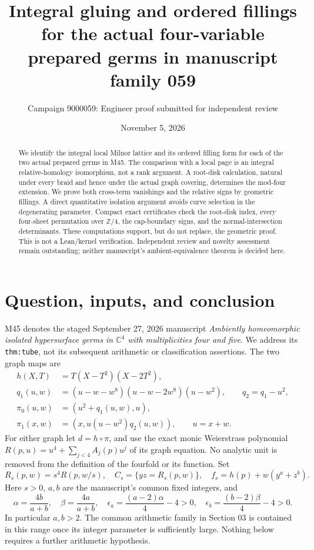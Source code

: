 \documentclass[11pt]{article}
\title{Integral gluing and ordered fillings for the actual
four-variable prepared germs in manuscript family 059}
\author{Campaign 9000059: Engineer proof submitted for independent review}
\date{November 5, 2026}
\newcommand{\Z}{\mathbb Z}
\newcommand{\C}{\mathbb C}
\begin{document}
\maketitle

\begin{abstract}
We identify the integral local Milnor lattice and its ordered filling
form for each of the two actual prepared germs in M45. The comparison
with a local page is an integral relative-homology isomorphism, not a
rank argument. A root-disk calculation, natural under every braid
and hence under the actual graph covering, determines the mod-four
extension. We prove both cross-term vanishings and the relative signs
by geometric fillings. A direct quantitative isolation argument
avoids curve selection in the degenerating parameter. Compact exact
certificates check the root-disk index, every four-sheet permutation
over \(\Z/4\), the cap-boundary signs, and the normal-intersection
determinants. These computations support, but do not replace, the
geometric proof. This is not a Lean/kernel verification. Independent
review and novelty assessment remain outstanding; neither manuscript's
ambient-equivalence theorem is decided here.
\end{abstract}

\section{Question, inputs, and conclusion}

M45 denotes the staged September 27, 2026 manuscript
\emph{Ambiently homeomorphic isolated hypersurface germs in
\(\C^4\) with multiplicities four and five}.
We address its \texttt{thm:tube}, not its subsequent arithmetic or
classification assertions. The two graph maps are
\[
\begin{split}
h(X,T)&=T(X-T^2)(X-2T^2),\\
q_1(u,w)&=(u-w-w^8)(u-w-2w^8)(u-w^2),\qquad q_2=q_1-u^2,\\
\pi_0(u,w)&=(u^2+q_1(u,w),u),\\
\pi_1(x,w)&=(x,u(u-w^2)q_2(u,w)),\qquad u=x+w .
\end{split}
\]
For either graph let \(d=h\circ\pi\), and use the exact monic
Weierstrass polynomial \(R(p,u)=u^4+\sum_{j<4}A_j(p)u^j\)
of its graph equation. No analytic unit is removed from the
definition of the fourfold or its function. Set
\[
 R_s(p,w)=s^4R(p,w/s),\quad C_s=\{yz=R_s(p,w)\},\quad
 f_s=h(p)+w(y^a+z^b).
\]
Here \(s>0\), \(a,b\) are the manuscript's common fixed integers, and
\[
 \alpha=\frac{4b}{a+b},\quad\beta=\frac{4a}{a+b},\quad
 \epsilon_a=\frac{(a-2)\alpha}{4}-4>0,\quad
 \epsilon_b=\frac{(b-2)\beta}{4}-4>0.                 \tag{1}
\]
In particular \(a,b>2\). The common arithmetic family in Section 03
is contained in this range once its integer parameter is sufficiently
large. Nothing below requires a further arithmetic hypothesis.
\end{document}
